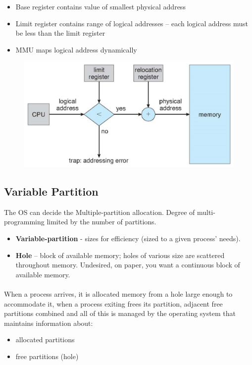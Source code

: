 \begin{itemize}
    \item Base register contains value of smallest physical address
    \item Limit register contains range of logical addresses – each logical address must be less than the limit register
    \item MMU maps logical address dynamically
\end{itemize}


 \begin{figure}[htbp]
     \centering
     \includegraphics[width=0.65\linewidth]{img/fbs.png}
 \end{figure}


\subsection{Variable Partition}

The OS can decide the Multiple-partition allocation. Degree of multi-programming limited by the number of partitions.

\begin{itemize}
    \item \textbf{Variable-partition} - sizes for efficiency (sized to a given process’ needs).
    \item \textbf{Hole} – block of available memory; holes of various size are scattered throughout memory. Undesired, on paper, you want a continuous block of available memory.
\end{itemize}

\paragraph{}
\newpage
When a process arrives, it is allocated memory from a hole large enough to
accommodate it, when a  process exiting frees its partition, adjacent free partitions combined and all of this is managed by the operating system that maintains information about:

\begin{itemize}
    \item allocated partitions
    \item free partitions (hole)
\end{itemize}

